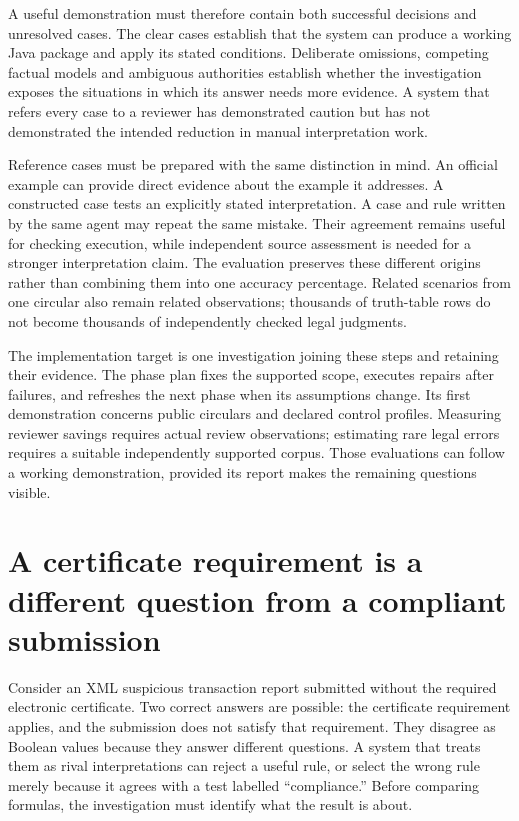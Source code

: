 \documentclass[12pt,a4paper,oneside,openany]{book}
\begin{document}
A useful demonstration must therefore contain both successful decisions and
unresolved cases. The clear cases establish that the system can produce a
working Java package and apply its stated conditions. Deliberate omissions,
competing factual models and ambiguous authorities establish whether the
investigation exposes the situations in which its answer needs more evidence.
A system that refers every case to a reviewer has demonstrated caution but
has not demonstrated the intended reduction in manual interpretation work.

Reference cases must be prepared with the same distinction in mind. An official
example can provide direct evidence about the example it addresses. A constructed
case tests an explicitly stated interpretation. A case and rule written by the
same agent may repeat the same mistake. Their agreement remains useful for
checking execution, while independent source assessment is needed for a stronger
interpretation claim. The evaluation preserves these different origins rather
than combining them into one accuracy percentage. Related scenarios from one
circular also remain related observations; thousands of truth-table rows do not
become thousands of independently checked legal judgments.

The implementation target is one investigation joining these steps and retaining
their evidence. The phase plan fixes the supported scope, executes repairs after
failures, and refreshes the next phase when its assumptions change. Its first
demonstration concerns public circulars and declared control profiles. Measuring
reviewer savings requires actual review observations; estimating rare legal
errors requires a suitable independently supported corpus. Those evaluations
can follow a working demonstration, provided its report makes the remaining
questions visible.

\section{A certificate requirement is a different question from a compliant submission}
\label{sec:typed-decision-assurance}

Consider an XML suspicious transaction report submitted without the required
electronic certificate. Two correct answers are possible: the certificate
requirement applies, and the submission does not satisfy that requirement.
They disagree as Boolean values because they answer different questions. A
system that treats them as rival interpretations can reject a useful rule,
or select the wrong rule merely because it agrees with a test labelled
``compliance.'' Before comparing formulas, the investigation must identify what
the result is about.
\end{document}
